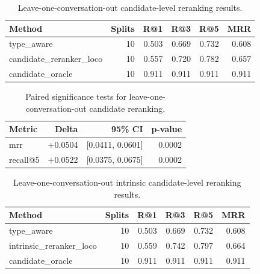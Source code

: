 \begin{table}[t]
\centering
\caption{Leave-one-conversation-out candidate-level reranking results.}
\label{tab:candidate_reranker_loco}
\begin{tabular}{lrrrrr}
\toprule
Method & Splits & R@1 & R@3 & R@5 & MRR \\
\midrule
type\_aware & 10 & 0.503 & 0.669 & 0.732 & 0.608 \\
candidate\_reranker\_loco & 10 & 0.557 & 0.720 & 0.782 & 0.657 \\
candidate\_oracle & 10 & 0.911 & 0.911 & 0.911 & 0.911 \\
\bottomrule
\end{tabular}
\end{table}

\begin{table}[t]
\centering
\caption{Paired significance tests for leave-one-conversation-out candidate reranking.}
\label{tab:candidate_reranker_loco_sig}
\begin{tabular}{lrrr}
\toprule
Metric & Delta & 95\% CI & p-value \\
\midrule
mrr & +0.0504 & [0.0411, 0.0601] & 0.0002 \\
recall@5 & +0.0522 & [0.0375, 0.0675] & 0.0002 \\
\bottomrule
\end{tabular}
\end{table}

\begin{table}[t]
\centering
\caption{Leave-one-conversation-out intrinsic candidate-level reranking results.}
\label{tab:intrinsic_candidate_reranker_loco}
\begin{tabular}{lrrrrr}
\toprule
Method & Splits & R@1 & R@3 & R@5 & MRR \\
\midrule
type\_aware & 10 & 0.503 & 0.669 & 0.732 & 0.608 \\
intrinsic\_reranker\_loco & 10 & 0.559 & 0.742 & 0.797 & 0.664 \\
candidate\_oracle & 10 & 0.911 & 0.911 & 0.911 & 0.911 \\
\bottomrule
\end{tabular}
\end{table}

